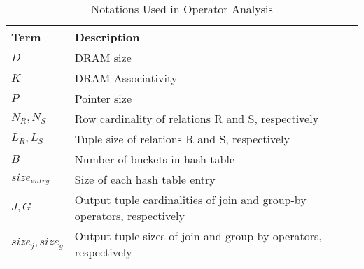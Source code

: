 \begin{table}[!h]
\centering
\caption{Notations Used in Operator Analysis}
\label{tab:notations}
\begin{small}
\begin{tabular}{p{2cm}p{9cm}}
\toprule  
\textbf{Term} & \textbf{Description}\\ 
\midrule
\textbf{$D$} & DRAM size\\
\textbf{$K$} & DRAM Associativity\\
\textbf{$P$} & Pointer size\\
\textbf{$N_R, N_S$} & Row cardinality of relations R and S, respectively\\
\textbf{$L_R, L_S$} & Tuple size of relations R and S, respectively\\
\textbf{$B$} & Number of buckets in hash table\\
\textbf{$size_{entry}$} & Size of each hash table entry\\
\textbf{$J,G$} & Output tuple cardinalities of join and group-by operators, respectively\\
\textbf{$size_{j},size_{g}$} & Output tuple sizes of join and group-by operators, respectively\\
\bottomrule
\end{tabular}
\end{small}
\end{table}
